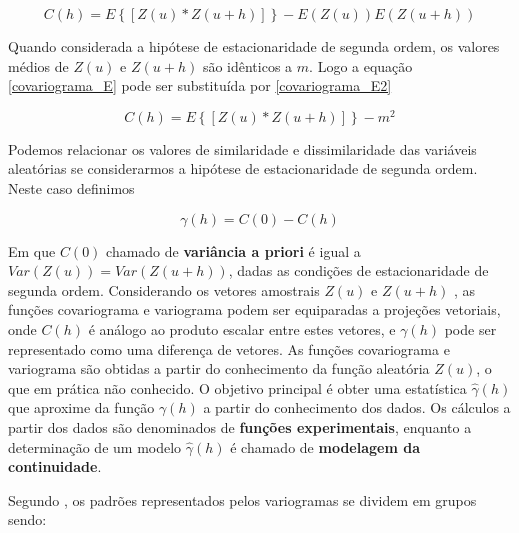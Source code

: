 \begin{equation} \label{covariograma_E} 
C(h) = E \left\{ \left[ Z(u)*Z(u+h) \right] \right\} - E(Z(u))E(Z(u+h))
\end{equation}

Quando considerada a hipótese de estacionaridade de segunda ordem, os valores médios de $Z(u)$ e $Z(u+h)$ são idênticos a $m$. Logo a equação \ref{covariograma_E} pode ser substituída por \ref{covariograma_E2} 

\begin{equation} \label{covariograma_E2} 
C(h) = E \left\{ \left[ Z(u)*Z(u+h) \right] \right\} - m^{2}
\end{equation}

Podemos relacionar os valores de similaridade e dissimilaridade das variáveis aleatórias se considerarmos a hipótese de estacionaridade de segunda ordem. Neste caso definimos 

\begin{equation} \label{relation} 
\gamma(h) = C(0) - C(h)
\end{equation}

 Em que $C(0)$ chamado de \textbf{variância a priori} é igual a $Var(Z(u)) = Var(Z(u+h))$, dadas as condições de estacionaridade de segunda ordem. Considerando os vetores amostrais $Z(u)$ e $Z(u+h)$ , as funções covariograma e variograma podem ser equiparadas a projeções vetoriais, onde $C(h)$ é análogo ao produto escalar entre estes vetores, e $\gamma(h)$ pode ser representado como uma diferença de vetores. As funções covariograma e variograma são obtidas a partir do conhecimento da função aleatória $Z(u)$, o que em prática não conhecido. O objetivo principal é obter uma estatística $\hat{\gamma}(h)$ que aproxime da função $\gamma(h)$ a partir do conhecimento dos dados. Os cálculos a partir dos dados são denominados de \textbf{funções experimentais}, enquanto a determinação de um modelo $\hat{\gamma}(h)$ é chamado de \textbf{modelagem da continuidade}. 
 
 Segundo \cite{gringarten2001teacher}, os padrões representados pelos variogramas se dividem em grupos sendo:
 

